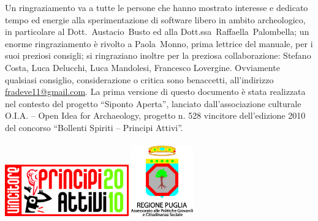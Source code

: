 	Un ringraziamento va a tutte le persone che hanno mostrato interesse e dedicato tempo ed energie alla sperimentazione di software libero in ambito archeologico, in particolare al Dott.~Austacio~Busto ed alla Dott.ssa~Raffaella~Palombella; un enorme ringraziamento è rivolto a Paola~Monno, prima lettrice del manuale, per i suoi preziosi consigli; si ringraziano inoltre per la preziosa collaborazione: Stefano Costa, Luca Delucchi, Luca Mandolesi, Francesco Lovergine. Ovviamente qualsiasi consiglio, considerazione o critica sono benaccetti, all'indirizzo \href{mailto:fradeve11@gmail.com}{fradeve11@gmail.com}.
	\vfill
	La prima versione di questo documento è stata realizzata nel contesto del progetto ``Siponto Aperta'', lanciato dall'associazione culturale O.I.A. -- Open Idea for Archaeology, progetto n. 528 vincitore dell'edizione 2010 del concorso ``Bollenti Spiriti -- Principi Attivi''.\\~\\
	\includegraphics[width=0.4\textwidth]{img/logo-pa/c_Logo_vincitore_orizz}\hfill
	\includegraphics[width=0.2\textwidth]{img/logo-pa/b_Logo_Regione}
